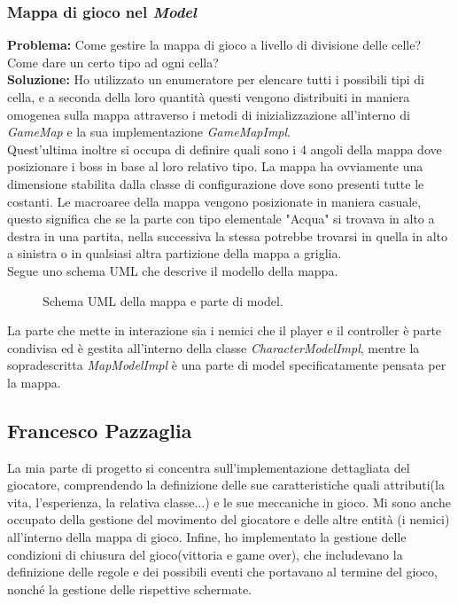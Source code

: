 \documentclass[a4paper,12pt]{report}
\begin{document}
\subsubsection{Mappa di gioco nel \textit{Model}}
\textbf{Problema:} Come gestire la mappa di gioco a livello di divisione delle celle? Come dare un certo tipo ad ogni cella?\\
\textbf{Soluzione:} Ho utilizzato un enumeratore per elencare tutti i possibili tipi di cella, e a seconda della loro quantità questi vengono distribuiti in maniera omogenea sulla mappa attraverso i metodi di inizializzazione all'interno di \textit{GameMap} e la sua implementazione \textit{GameMapImpl}.\\ Quest'ultima inoltre si occupa di definire quali sono i 4 angoli della mappa dove posizionare i boss in base al loro relativo tipo. La mappa ha ovviamente una dimensione stabilita dalla classe di configurazione dove sono presenti tutte le costanti.
Le macroaree della mappa vengono posizionate in maniera casuale, questo significa che se la parte con tipo elementale "Acqua" si trovava in alto a destra in una partita, nella successiva la stessa potrebbe trovarsi in quella in alto a sinistra o in qualsiasi altra partizione della mappa a griglia.\\
Segue uno schema UML che descrive il modello della mappa.

\begin{figure}[H]
	\centering
	
	\caption{Schema UML della mappa e parte di model.}
	\label{fig:Schema UML della mappa e parte di model.}
\end{figure}

La parte che mette in interazione sia i nemici che il player e il controller è parte condivisa ed è gestita all'interno della classe \textit{CharacterModelImpl}, mentre la sopradescritta \textit{MapModelImpl} è una parte di model specificatamente pensata per la mappa.

\subsection{Francesco Pazzaglia}
La mia parte di progetto si concentra sull'implementazione dettagliata del giocatore, comprendendo la definizione delle sue caratteristiche quali attributi(la vita, l'esperienza, la relativa classe...) e le sue meccaniche in gioco. Mi sono anche occupato della gestione del movimento del giocatore e delle altre entità (i nemici) all'interno della mappa di gioco. Infine, ho implementato la gestione delle condizioni di chiusura del gioco(vittoria e game over), che includevano la definizione delle regole e dei possibili eventi che portavano al termine del gioco, nonché la gestione delle rispettive schermate.
\end{document}
